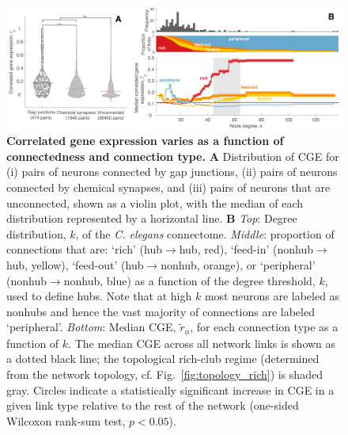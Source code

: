 \documentclass[10pt,letterpaper]{article}
\begin{document}
 \begin{figure}[h]
 \centering
    \includegraphics[width=1\textwidth]{MeanCoexpression4.pdf}
\caption{{\bf Correlated gene expression varies as a function of connectedness and connection type.}
\textbf{A} Distribution of CGE for (i) pairs of neurons connected by gap junctions, (ii) pairs of neurons connected by chemical synapses, and (iii) pairs of neurons that are unconnected, shown as a violin plot, with the median of each distribution represented by a horizontal line.
\textbf{B}
\emph{Top}: Degree distribution, $k$, of the \emph{C. elegans} connectome.
\emph{Middle}: proportion of connections that are:
`rich' (hub$\rightarrow$hub, red),
`feed-in' (nonhub$\rightarrow$hub, yellow),
`feed-out' (hub$\rightarrow$nonhub, orange), or
`peripheral' (nonhub$\rightarrow$nonhub, blue) as a function of the degree threshold, $k$, used to define hubs.
Note that at high $k$ most neurons are labeled as nonhubs and hence the vast majority of connections are labeled `peripheral'.
 \emph{Bottom}: Median CGE, $\tilde{r}_\phi$, for each connection type as a function of $k$.
The median CGE across all network links is shown as a dotted black line; the topological rich-club regime (determined from the network topology, cf. Fig.~\ref{fig:topology_rich}) is shaded gray.
Circles indicate a statistically significant increase in CGE in a given link type relative to the rest of the network (one-sided Wilcoxon rank-sum test, $p < 0.05$).
}
 \label{fig:coExp}
\end{figure}
\end{document}
